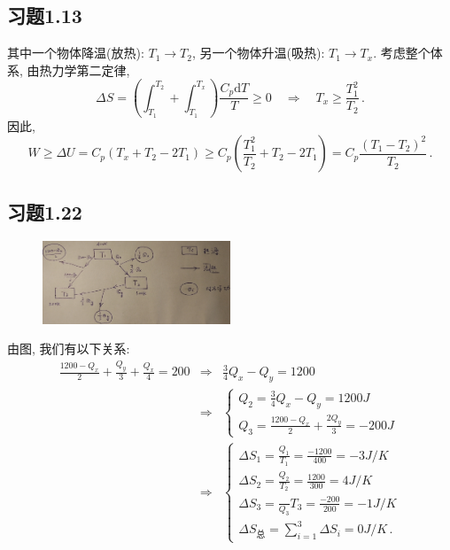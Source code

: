 \documentclass[letterpaper, 10pt]{article}
\newcommand{\dd}{\mathrm{d}}
\begin{document}
\subsection{习题1.13}
其中一个物体降温(放热): $ T_{1} \rightarrow T_{2} $, 另一个物体升温(吸热): $ T_{1} \rightarrow T_x $. 考虑整个体系, 由热力学第二定律, 
\[ \Delta S = \left( \int_{T_{1}}^{T_{2}} + \int_{T_{1}}^{T_x} \right) \frac{C_{p}\dd T}{T} \geq 0 \quad{} \Rightarrow \quad{} T_x \geq \frac{T_{1}^2}{T_{2}} \,. \]
因此, 
\[ W \geq \Delta U = C_{p} (T_x + T_{2} - 2T_{1}) \geq C_{p} \left( \frac{T_{1}^2}{T_{2}} + T_{2} - 2 T_{1} \right) = C_{p} \frac{(T_{1}-T_{2})^2}{T_{2}} \,. \]

\subsection{习题1.22}
\begin{figure}[htbp]
\centering
\includegraphics[width=0.5\textwidth]{heat-machine}
\end{figure}
由图, 我们有以下关系:
\begin{eqnarray*}
\frac{1200-Q_x}{2} + \frac{Q_y}{3} + \frac{Q_x}{4} = 200 & \Rightarrow & \frac{3}{4}Q_x - Q_y = 1200 \\
& \Rightarrow &
\begin{cases}
Q_2 = \frac{3}{4} Q_x - Q_y = 1200 J \\
Q_3 = \frac{1200-Q_x}{2} + \frac{2Q_y}{3} = -200J
\end{cases} \\
& \Rightarrow & 
\begin{cases}
\Delta S_1 = \frac{Q_1}{T_1} = \frac{-1200}{400} = -3J/K \\
\Delta S_2 = \frac{Q_2}{T_2} = \frac{1200}{300} = 4J/K \\ 
\Delta S_3 = \frac{}{Q_3}{T_3} = \frac{-200}{200} = -1J/K \\
\Delta S_{\text{总}} = \sum_{i = 1}^{3} \Delta S_{i} = 0J/K \,.
\end{cases}
\end{eqnarray*}
\end{document}

